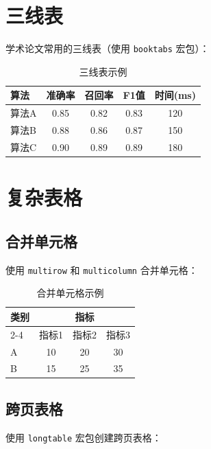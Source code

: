 \section{三线表}

学术论文常用的三线表（使用 \texttt{booktabs} 宏包）：

\begin{table}[htbp]
  \centering
  \caption{三线表示例}
  \label{tab:threeline}
  \begin{tabular}{lcccc}
    \toprule
    算法 & 准确率 & 召回率 & F1值 & 时间(ms) \\
    \midrule
    算法A & 0.85 & 0.82 & 0.83 & 120 \\
    算法B & 0.88 & 0.86 & 0.87 & 150 \\
    算法C & 0.90 & 0.89 & 0.89 & 180 \\
    \bottomrule
  \end{tabular}
\end{table}

\section{复杂表格}

\subsection{合并单元格}

使用 \texttt{multirow} 和 \texttt{multicolumn} 合并单元格：

\begin{table}[htbp]
  \centering
  \caption{合并单元格示例}
  \begin{tabular}{|l|c|c|c|}
    \hline
    \multirow{2}{*}{类别} & \multicolumn{3}{c|}{指标} \\
    \cline{2-4}
    & 指标1 & 指标2 & 指标3 \\
    \hline
    A & 10 & 20 & 30 \\
    B & 15 & 25 & 35 \\
    \hline
  \end{tabular}
\end{table}

\subsection{跨页表格}

使用 \texttt{longtable} 宏包创建跨页表格：

